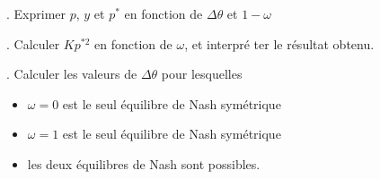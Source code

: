 \documentclass[11pt,a4paper]{article}
\begin{document}
\bigskip


. Exprimer $p$, $y$ et $p^{\ast }$ en fonction de $\Delta \theta$ et $%
1-\omega $

\bigskip

. Calculer $Kp^{\ast 2}$ en fonction de $\omega $, et interpr\'{e}%
ter le r\'{e}sultat obtenu.

\bigskip

. Calculer les valeurs de $\Delta \theta $ pour lesquelles

\begin{itemize}
\item $\omega =0$ est le seul \'{e}quilibre de Nash sym\'{e}trique

\item $\omega =1$ est le seul \'{e}quilibre de Nash sym\'{e}trique

\item les deux \'{e}quilibres de Nash sont possibles.
\end{itemize}

\newpage
\end{document}
